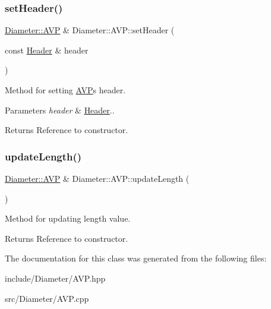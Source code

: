 \subsubsection{\texorpdfstring{set\+Header()}{setHeader()}}
{\footnotesize\ttfamily \hyperlink{classDiameter_1_1AVP}{Diameter\+::\+A\+VP} \& Diameter\+::\+A\+V\+P\+::set\+Header (\begin{DoxyParamCaption}\item[{const \hyperlink{classDiameter_1_1AVP_1_1Header}{Header} \&}]{header }\end{DoxyParamCaption})}



Method for setting \hyperlink{classDiameter_1_1AVP}{A\+VP}\textquotesingle{}s header. 


\begin{DoxyParams}{Parameters}
{\em header} & \hyperlink{classDiameter_1_1AVP_1_1Header}{Header}.. \\
\hline
\end{DoxyParams}
\begin{DoxyReturn}{Returns}
Reference to constructor. 
\end{DoxyReturn}
\mbox{\label{classDiameter_1_1AVP_abb3ae19edc433ec2832e4cf2d72c425d}} 
\subsubsection{\texorpdfstring{update\+Length()}{updateLength()}}
{\footnotesize\ttfamily \hyperlink{classDiameter_1_1AVP}{Diameter\+::\+A\+VP} \& Diameter\+::\+A\+V\+P\+::update\+Length (\begin{DoxyParamCaption}{ }\end{DoxyParamCaption})}



Method for updating length value. 

\begin{DoxyReturn}{Returns}
Reference to constructor. 
\end{DoxyReturn}


The documentation for this class was generated from the following files\+:\begin{DoxyCompactItemize}
\item 
include/\+Diameter/A\+V\+P.\+hpp\item 
src/\+Diameter/A\+V\+P.\+cpp\end{DoxyCompactItemize}
